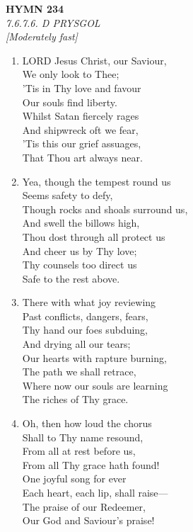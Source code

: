 \documentclass[11pt,a4paper]{article}
\begin{document}
\newpage
\begin{center}
    {\Large \textbf{HYMN 234}}
    \\
    \textit{7.6.7.6. D PRYSGOL}
    \\
    \textit{\small [Moderately fast]}
\end{center}
\vspace{1em}

\begin{enumerate}
    \item LORD Jesus Christ, our Saviour, \\
            We only look to Thee; \\
        'Tis in Thy love and favour \\
            Our souls find liberty. \\
        Whilst Satan fiercely rages \\
            And shipwreck oft we fear, \\
        'Tis this our grief assuages, \\
            That Thou art always near.

    \item Yea, though the tempest round us \\
            Seems safety to defy, \\
        Though rocks and shoals surround us, \\
            And swell the billows high, \\
        Thou dost through all protect us \\
            And cheer us by Thy love; \\
        Thy counsels too direct us \\
            Safe to the rest above.

    \item There with what joy reviewing \\
            Past conflicts, dangers, fears, \\
        Thy hand our foes subduing, \\
            And drying all our tears; \\
        Our hearts with rapture burning, \\
            The path we shall retrace, \\
        Where now our souls are learning \\
            The riches of Thy grace.

    \item Oh, then how loud the chorus \\
            Shall to Thy name resound, \\
        From all at rest before us, \\
            From all Thy grace hath found! \\
        One joyful song for ever \\
            Each heart, each lip, shall raise--- \\
        The praise of our Redeemer, \\
            Our God and Saviour's praise!

\end{enumerate}
\end{document}
